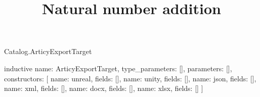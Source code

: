 \begin{lexlean}{Catalog.ArticyExportTarget}
\title{Natural number addition}
\begin{semanticmodule}
inductive{
  name: ArticyExportTarget,
  type_parameters: [],
  parameters: [],
  constructors: [
    {name: unreal, fields: []},
    {name: unity, fields: []},
    {name: json, fields: []},
    {name: xml, fields: []},
    {name: docx, fields: []},
    {name: xlsx, fields: []}
  ]
}
\end{semanticmodule}
\end{lexlean}
